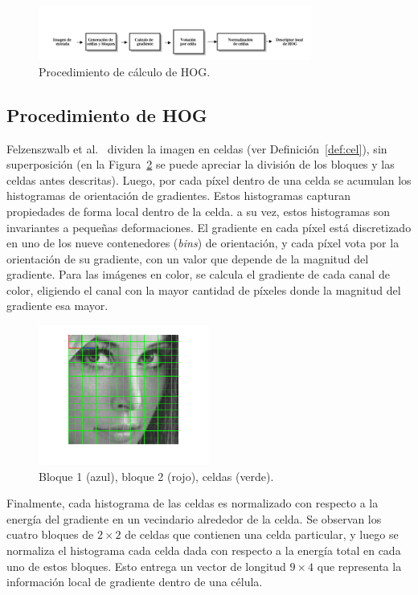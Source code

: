 \begin{figure}[tb]
 \centering
  \includegraphics[width=0.8\textwidth]{Figuras/hog-procedure.png}
  \caption[Procedimiento de cálculo de HOG]{Procedimiento de cálculo de HOG.}
  \label{fig:hog_procedure}
\end{figure}

\subsection{Procedimiento de HOG}
Felzenszwalb et al.~\cite{Felzenszwalb2010} dividen la imagen en celdas (ver Definición~\ref{def:cel}), sin superposición (en la Figura~\ref{fig:blocks_cells} se puede apreciar la división de los bloques y las celdas antes descritas). Luego, por cada píxel dentro de una celda se acumulan los histogramas de orientación de gradientes. Estos histogramas capturan propiedades de forma local dentro de la celda. a su vez, estos histogramas son invariantes a pequeñas deformaciones.
El gradiente en cada píxel está discretizado en uno de los nueve contenedores (\textit{bins}) de orientación, y cada píxel vota por la orientación de su gradiente, con un valor que depende de la magnitud del gradiente. Para las imágenes en color, se calcula el gradiente de cada canal de color, eligiendo el canal con la mayor cantidad de píxeles donde la magnitud del gradiente esa mayor.

\begin{figure}[tb]
 \centering
  \includegraphics[width=0.5\textwidth]{Figuras/lena-grid.png}
  \caption[Bloques y celdas]{Bloque 1 (azul), bloque 2 (rojo), celdas (verde).}
  \label{fig:blocks_cells}
\end{figure}

Finalmente, cada histograma de las celdas es normalizado con respecto a la energía del gradiente en un vecindario alrededor de la celda. Se observan los cuatro bloques de $2 \times 2$ de celdas que contienen una celda particular, y luego se normaliza el histograma cada celda dada con respecto a la energía total en cada uno de estos bloques. Esto entrega un vector de longitud $9 \times 4$ que representa la información local de gradiente dentro de una célula.

